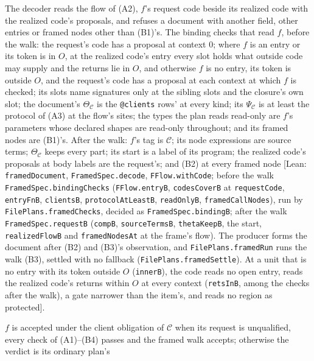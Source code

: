\documentclass[10pt,a4paper]{article}
\theoremstyle{definition}
\theoremstyle{remark}
\newcommand{\code}[1]{\texttt{#1}}
\newcommand{\lean}[1]{\texttt{\small #1}}
\newcommand{\status}[1]{\textsf{\small[#1]}}
\newcommand{\cC}{\mathcal{C}}
\begin{document}
\begin{description}[leftmargin=1.5em,style=nextline]
The decoder reads the flow of (A2), $f$'s request code beside its
realized code with the realized code's proposals, and refuses a document
with another field, other entries or framed nodes other than (B1)'s.
The binding checks that read $f$, before the walk: the request's code
has a proposal at context $0$; where $f$ is an entry or its token is in
$O$, at the realized code's entry every slot holds what outside code may
supply and the returns lie in $O$, and otherwise $f$ is no entry, its
token is outside $O$, and the request's code has a proposal at each
context at which $f$ is checked; its slots
name signatures only at the sibling slots and the closure's own slot; the
document's $\Theta_\cC$ is the \code{@clients} rows' at every kind; its
$\Psi_\cC$ is at least the protocol of (A3) at the flow's sites; the types
the plan reads read-only are $f$'s parameters whose declared shapes are
read-only throughout; and its framed nodes are (B1)'s. After the walk:
$f$'s tag is $\cC$; its node expressions are source terms; $\Theta_\cC$
keeps every part; its start is a label of its program; the realized
code's proposals at body labels are the request's; and (B2) at every
framed node
\status{Lean: \lean{framedDocument}, \lean{FramedSpec.decode}, \lean{FFlow.withCode}; before the walk \lean{FramedSpec.bindingChecks} (\lean{FFlow.entryB}, \lean{codesCoverB} at \lean{requestCode}, \lean{entryFnB}, \lean{clientsB}, \lean{protocolAtLeastB}, \lean{readOnlyB}, \lean{framedCallNodes}), run by \lean{FilePlans.framedChecks}, decided as \lean{FramedSpec.bindingB}; after the walk \lean{FramedSpec.requestB} (\lean{compB}, \lean{sourceTermsB}, \lean{thetaKeepB}, the start, \lean{realizedFlowB} and \lean{framedNodesAt} at the frame's flow). The producer forms the document after (B2) and (B3)'s observation, and \lean{FilePlans.framedRun} runs the walk (B3), settled with no fallback (\lean{FilePlans.framedSettle}). At a unit that is no entry with its token outside $O$ (\lean{innerB}), the code reads no open entry, reads the realized code's returns within $O$ at every context (\lean{retsInB}, among the checks after the walk), a gate narrower than the item's, and reads no region as protected}.
\item[(B5) The verdict] $f$ is accepted under the client obligation of
$\cC$ when its request is unqualified, every check of (A1)--(B4) passes
and the framed walk accepts;
otherwise the verdict is its ordinary plan's

\end{description}
\end{document}
